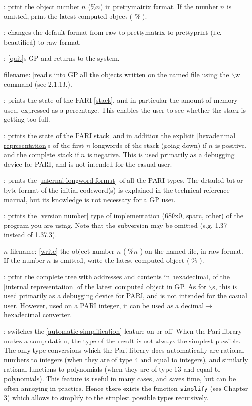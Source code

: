 : print the object number $n$ ($\%n$)
in prettymatrix format. If the number $n$ is omitted, print the latest
computed object ( $\%$ ).

: changes the default format from raw
 to prettymatrix to
prettyprint (i.e. beautified) to raw format.

: \ref{quit}s GP and returns to the system.

 filename: \ref{read}s into GP all the objects written
 on the named file using the $\backslash$w command (see 2.1.13.).

: prints the state of the PARI \ref{stack}, and
in
particular the amount of memory used, expressed as a percentage. This enables
the user to see whether the stack is getting too full.

: prints the state of the PARI
stack,
and in addition the explicit \ref{hexadecimal representation}s of the first $n$
longwords of the stack (going down) if $n$ is positive, and the complete
stack
if $n$ is negative. This is used primarily as a debugging device for PARI,
and is not intended for the casual user.

: prints the \ref{internal longword format}
of all the PARI types. The detailed bit or byte format of the initial
codeword(s) is explained in the technical reference manual, but its knowledge
is not necessary for a GP user.

: prints the \ref{version number} type of
implementation (680x0, sparc, other) of the program you are using. Note
that the subversion may be omitted (e.g. 1.37 instead of 1.37.3).

$n$ filename: \ref{write} the object number $n$
( $\%n$ ) on the named file, in raw format. If the number $n$ is omitted,
write the latest computed object ( $\%$ ).

: print the complete tree with
addresses and contents in hexadecimal, of the \ref{internal representation} of
the latest computed object in GP. As for $\backslash$s, this is used primarily
as a debugging device for PARI, and is not intended for the casual user.
However, used on a PARI integer, it can be used as a 
decimal$\rightarrow$hexadecimal converter.

: switches the \ref{automatic simplification}
feature on or off. When the Pari library makes a computation, the type of the
result is not always the simplest possible. The only type conversions which
the Pari library does automatically are rational numbers to integers (when
they are of type 4 and equal to integers), and similarly rational functions
to polynomials (when they are of type 13 and equal to polynomials). This
feature is useful in many cases, and saves time, but can be often annoying
in practice. Hence there exists the function {\tt simplify} (see Chapter 3)
which allows to simplify to the simplest possible types recursively.

